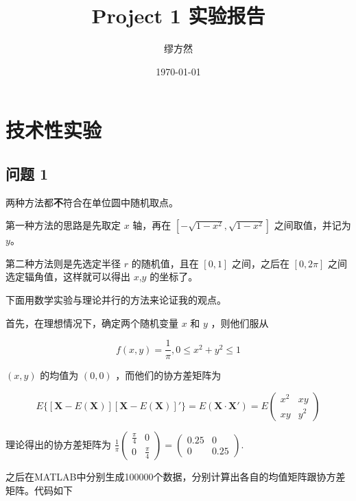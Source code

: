 \documentclass[12pt]{ctexart}
\title{Project 1 实验报告}
\author{缪方然}
\date{\today}
\begin{document}
\maketitle


\section{技术性实验}

\subsection{问题 1}

两种方法都\textbf{不}符合在单位圆中随机取点。

第一种方法的思路是先取定 $x$ 轴，再在 $[-\sqrt{1-x^2},\sqrt{1-x^2}]$ 之间取值，并记为 $y$。

第二种方法则是先选定半径 $r$ 的随机值，且在 \([0,1]\) 之间，之后在 $[0,2\pi]$ 之间选定辐角值，这样就可以得出 $x$,$y$ 的坐标了。

下面用数学实验与理论并行的方法来论证我的观点。

首先，在理想情况下，确定两个随机变量 $x$ 和 $y$ ，则他们服从

\[f(x,y)=\frac1{\pi},0\le x^2+y^2\le 1\]

$(x,y)$ 的均值为 $(0,0)$ ，而他们的协方差矩阵为

\[E\{[\mathbf X-E(\mathbf X)][\mathbf X-E(\mathbf X)]'\}
    =E(\mathbf X \cdot \mathbf X')=E\begin{pmatrix}
        x^2 & xy  \\
        xy  & y^2
    \end{pmatrix}\]

理论得出的协方差矩阵为 $\frac1\pi\begin{pmatrix}
        \frac{\pi}{4} & 0 \\  0 & \frac{\pi}{4}
    \end{pmatrix}=\begin{pmatrix}
        0.25 & 0 \\  0 & 0.25
    \end{pmatrix}$.

\vspace{2em}
之后在MATLAB中分别生成100000个数据，分别计算出各自的均值矩阵跟协方差矩阵。代码如下


\end{document}
